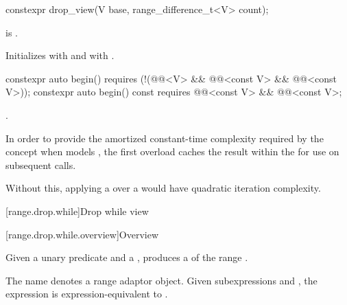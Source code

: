 %
\begin{itemdecl}
constexpr drop_view(V base, range_difference_t<V> count);
\end{itemdecl}

\begin{itemdescr}
\pnum
\expects
{} is .

\pnum
\effects
Initializes  with  and
 with .
\end{itemdescr}

%
\begin{itemdecl}
constexpr auto begin()
  requires (!(@@<V> &&
              @@<const V> && @@<const V>));
constexpr auto begin() const
  requires @@<const V> && @@<const V>;
\end{itemdecl}

\begin{itemdescr}
\pnum
\returns
{}.

\pnum
\remarks
In order to provide the amortized constant-time complexity required
by the  concept
when  models ,
the first overload caches the result within the 
for use on subsequent calls.
\begin{note}
Without this,
applying a  over a 
would have quadratic iteration complexity.
\end{note}
\end{itemdescr}

[range.drop.while]{Drop while view}

[range.drop.while.overview]{Overview}

\pnum
Given a unary predicate  and a  ,
 produces a 
of the range .

\pnum
{}%
The name 
denotes a range adaptor object.
Given subexpressions  and ,
the expression 
is expression-equivalent to .

